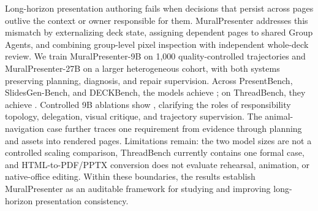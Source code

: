 Long-horizon presentation authoring fails when decisions that persist across pages outlive the context or owner responsible for them. MuralPresenter addresses this mismatch by externalizing deck state, assigning dependent pages to shared Group Agents, and combining group-level pixel inspection with independent whole-deck review. We train MuralPresenter-9B on 1,000 quality-controlled trajectories and MuralPresenter-27B on a larger heterogeneous cohort, with both systems preserving planning, diagnosis, and repair supervision. Across PresentBench, SlidesGen-Bench, and DECKBench, the models achieve ; on ThreadBench, they achieve . Controlled 9B ablations show , clarifying the roles of responsibility topology, delegation, visual critique, and trajectory supervision. The animal-navigation case further traces one requirement from evidence through planning and assets into rendered pages. Limitations remain: the two model sizes are not a controlled scaling comparison, ThreadBench currently contains one formal case, and HTML-to-PDF/PPTX conversion does not evaluate rehearsal, animation, or native-office editing. Within these boundaries, the results establish MuralPresenter as an auditable framework for studying and improving long-horizon presentation consistency.
